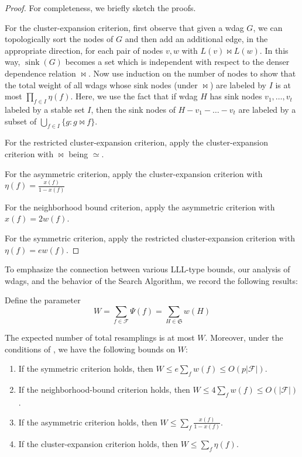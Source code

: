 \documentclass{toc}
\DeclareMathOperator{\sink}{sink}
\begin{document}
\begin{proof}
For completeness, we briefly sketch the proofs. 

For the cluster-expansion criterion, first observe that given
%
a  %
wdag $G$, we can topologically sort the nodes of $G$ and
%
 then add an additional edge, in the appropriate direction,
for each pair of nodes $v, w$ with $L(v) \bowtie L(w)$. 
In this way, $\sink(G)$ becomes a set which is independent with respect to the denser dependence relation $\bowtie$. Now use induction on 
the number of nodes %
%
to show that the total weight of all wdags whose sink nodes (under $\bowtie$) are labeled by $I$ is at most  $\prod_{f \in I} \eta(f)$. Here, we use the fact that if wdag $H$ has sink nodes $v_1, \dots, v_t$ labeled by a stable set $I$, then the sink nodes of $H - v_1 - \dots - v_t$ are labeled by a subset of $\bigcup_{f \in I} \{g: g \bowtie f \}$.

For the restricted cluster-expansion criterion, apply the cluster-expansion criterion with $\bowtie$ being $\simeq$.

For the asymmetric criterion, apply the cluster-expansion criterion with $\eta(f) = \frac{x(f)}{1 - x(f)}$

For the neighborhood bound criterion, apply the asymmetric criterion with $x(f) = 2 w(f)$.

For the symmetric criterion, apply the restricted cluster-expansion criterion with  $\eta(f) = e w(f)$.
\end{proof}

To emphasize the connection between various LLL-type bounds, our analysis of wdags, and the behavior of the Search Algorithm, we record the following results:
\begin{proposition}       %
\label{bndcord1}
Define the parameter
 $$
 W = \sum_{f \in \mathcal F} \Psi(f) = \sum_{H \in \mathfrak S} w(H)
 $$

The expected number of total %
resamplings %
is at most $W$.   Moreover, under the conditions of , we have the following bounds on $W$:
\begin{enumerate}
\item If the symmetric criterion holds, then $W \leq e  \sum_f w(f) \leq O( p |\mathcal F| )$.

\item If the neighborhood-bound criterion holds, then $W  \leq 4  \sum_f w(f) \leq O( |\mathcal F| )$.
\item If the asymmetric criterion holds, then $W  \leq  \sum_f \frac{x(f)}{1-x(f)}$.
\item If the cluster-expansion criterion holds, then $W \leq \sum_f \eta(f)$.
\end{enumerate}
\end{proposition}
\end{document}
